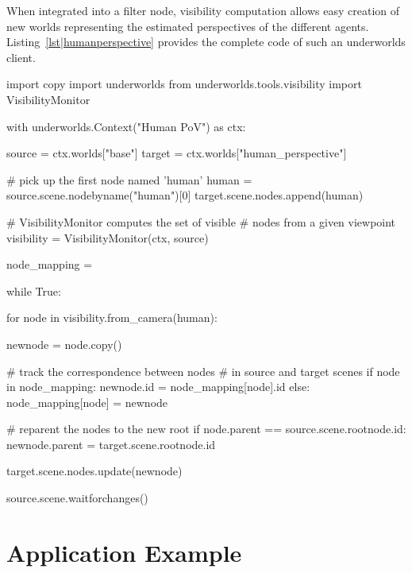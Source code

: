\documentclass[conference]{IEEEtran}
\newcommand{\uwds}{{\sc underworlds}\xspace}
\begin{document}
When integrated into a filter node, visibility computation allows easy
creation of new worlds representing the estimated perspectives of the different
agents. Listing~\ref{lst|humanperspective} provides the complete code of such an
\uwds client.


\begin{listing}[h!]
\begin{pythoncode}
import copy
import underworlds
from underworlds.tools.visibility import VisibilityMonitor

with underworlds.Context("Human PoV") as ctx:

    source = ctx.worlds["base"]
    target = ctx.worlds["human_perspective"]

    # pick up the first node named 'human'
    human = source.scene.nodebyname("human")[0]
    target.scene.nodes.append(human)

    # VisibilityMonitor computes the set of visible 
    # nodes from a given viewpoint
    visibility = VisibilityMonitor(ctx, source)

    node_mapping = {}

    while True:

        for node in visibility.from_camera(human):

            newnode = node.copy()

            # track the correspondence between nodes
            # in source and target scenes
            if node in node_mapping:
                newnode.id = node_mapping[node].id
            else:
                node_mapping[node] = newnode

            # reparent the nodes to the new root
            if node.parent == source.scene.rootnode.id:
                newnode.parent = target.scene.rootnode.id

            target.scene.nodes.update(newnode)

        source.scene.waitforchanges()

\end{pythoncode}
    \caption{Example of an \uwds client that creates a world named {\tt
    human\_perspective} from a source world {\tt base} by only updating objects
    that are in the field of view of the human. As such, {\tt human\_perspective} is
    a real-time model of the human perspective on the scene.}

    \label{lst|humanperspective}
\end{listing}


\section{Application Example}
\label{application}
\end{document}
